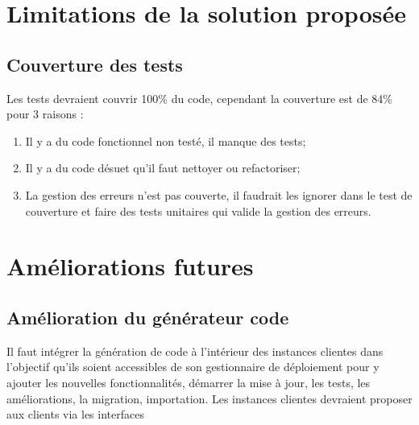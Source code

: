 \section{Limitations de la solution proposée}\label{sec:Limitations}

\subsection{Couverture des tests}
Les tests devraient couvrir 100\% du code, cependant la couverture est de 84\% pour 3 raisons :

\begin{enumerate}
    \item Il y a du code fonctionnel non testé, il manque des tests;
    \item Il y a du code désuet qu’il faut nettoyer ou refactoriser;
    \item La gestion des erreurs n’est pas couverte, il faudrait les ignorer dans le test de couverture et faire des tests unitaires qui valide la gestion des erreurs.
\end{enumerate}


\section{Améliorations futures}



\subsection{Amélioration du générateur code}
Il faut intégrer la génération de code à l’intérieur des instances clientes dans l’objectif qu’ils soient accessibles de son gestionnaire de déploiement pour y ajouter les nouvelles fonctionnalités, démarrer la mise à jour, les tests, les améliorations, la migration, importation. Les instances clientes devraient proposer aux clients via les interfaces 

